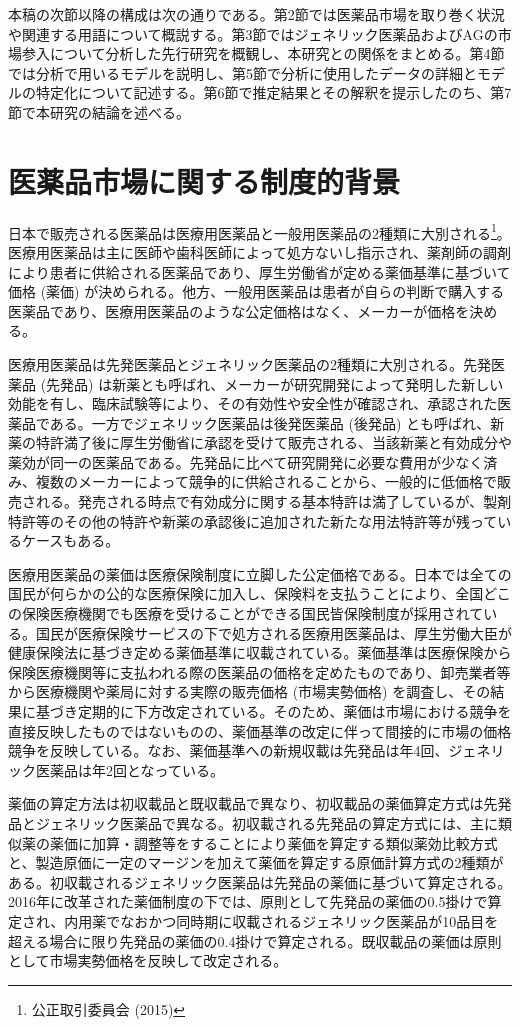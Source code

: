 \documentclass[a4j,10.5pt]{jarticle}
\begin{document}
本稿の次節以降の構成は次の通りである。第2節では医薬品市場を取り巻く状況や関連する用語について概説する。第3節ではジェネリック医薬品およびAGの市場参入について分析した先行研究を概観し、本研究との関係をまとめる。第4節では分析で用いるモデルを説明し、第5節で分析に使用したデータの詳細とモデルの特定化について記述する。第6節で推定結果とその解釈を提示したのち、第7節で本研究の結論を述べる。

\section{医薬品市場に関する制度的背景}
日本で販売される医薬品は医療用医薬品と一般用医薬品の2種類に大別される\footnote{公正取引委員会 (2015)}。医療用医薬品は主に医師や歯科医師によって処方ないし指示され、薬剤師の調剤により患者に供給される医薬品であり、厚生労働省が定める薬価基準に基づいて価格 (薬価) が決められる。他方、一般用医薬品は患者が自らの判断で購入する医薬品であり、医療用医薬品のような公定価格はなく、メーカーが価格を決める。\par
医療用医薬品は先発医薬品とジェネリック医薬品の2種類に大別される。先発医薬品 (先発品) は新薬とも呼ばれ、メーカーが研究開発によって発明した新しい効能を有し、臨床試験等により、その有効性や安全性が確認され、承認された医薬品である。一方でジェネリック医薬品は後発医薬品 (後発品) とも呼ばれ、新薬の特許満了後に厚生労働省に承認を受けて販売される、当該新薬と有効成分や薬効が同一の医薬品である。先発品に比べて研究開発に必要な費用が少なく済み、複数のメーカーによって競争的に供給されることから、一般的に低価格で販売される。発売される時点で有効成分に関する基本特許は満了しているが、製剤特許等のその他の特許や新薬の承認後に追加された新たな用法特許等が残っているケースもある。\par
医療用医薬品の薬価は医療保険制度に立脚した公定価格である。日本では全ての国民が何らかの公的な医療保険に加入し、保険料を支払うことにより、全国どこの保険医療機関でも医療を受けることができる国民皆保険制度が採用されている。国民が医療保険サービスの下で処方される医療用医薬品は、厚生労働大臣が健康保険法に基づき定める薬価基準に収載されている。薬価基準は医療保険から保険医療機関等に支払われる際の医薬品の価格を定めたものであり、卸売業者等から医療機関や薬局に対する実際の販売価格 (市場実勢価格) を調査し、その結果に基づき定期的に下方改定されている。そのため、薬価は市場における競争を直接反映したものではないものの、薬価基準の改定に伴って間接的に市場の価格競争を反映している。なお、薬価基準への新規収載は先発品は年4回、ジェネリック医薬品は年2回となっている。\par
薬価の算定方法は初収載品と既収載品で異なり、初収載品の薬価算定方式は先発品とジェネリック医薬品で異なる。初収載される先発品の算定方式には、主に類似薬の薬価に加算・調整等をすることにより薬価を算定する類似薬効比較方式と、製造原価に一定のマージンを加えて薬価を算定する原価計算方式の2種類がある。初収載されるジェネリック医薬品は先発品の薬価に基づいて算定される。2016年に改革された薬価制度の下では、原則として先発品の薬価の0.5掛けで算定され、内用薬でなおかつ同時期に収載されるジェネリック医薬品が10品目を超える場合に限り先発品の薬価の0.4掛けで算定される。既収載品の薬価は原則として市場実勢価格を反映して改定される。\par
\end{document}
